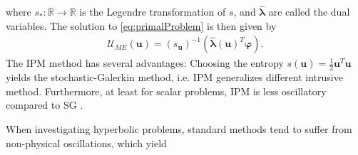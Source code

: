 where $s_*:\mathbb{R}\to\mathbb{R}$ is the Legendre transformation of $s$, and $\bm{ \hat\lambda}$ are called the dual variables. The solution to \eqref{eq:primalProblem} is then given by
\begin{align}\label{eq:ansatz}
 \mathcal{U}_{ME}(\bm{u}) = \left( s_{\bm{u}} \right)^{-1}(\bm{\hat{\lambda}}(\bm{u})^T \bm{\varphi}).
\end{align}
The IPM method has several advantages: Choosing the entropy $s(\bm{u}) = \frac{1}{2}\bm{u}^T\bm{u}$ yields the stochastic-Galerkin method, i.e. IPM generalizes different intrusive method. Furthermore, at least for scalar problems, IPM is less oscillatory compared to SG \cite{kusch2017maximum}.

When investigating hyperbolic problems, standard methods tend to suffer from non-physical oscillations, which yield 
